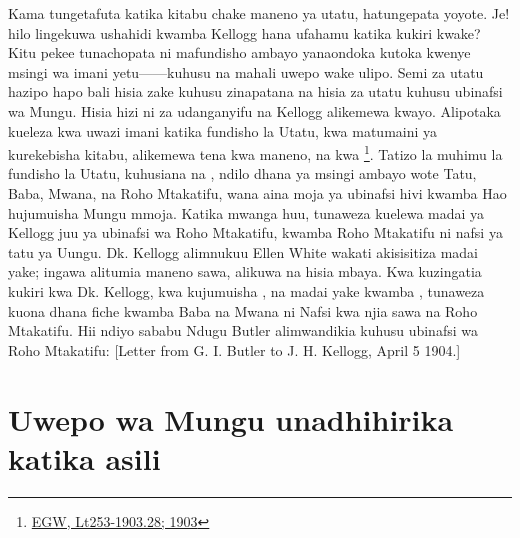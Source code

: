 Kama tungetafuta katika kitabu chake maneno ya utatu, hatungepata yoyote. Je! hilo lingekuwa ushahidi kwamba Kellogg hana ufahamu katika kukiri kwake? Kitu pekee tunachopata ni mafundisho ambayo yanaondoka kutoka kwenye msingi wa imani yetu——kuhusu  na mahali uwepo wake ulipo. Semi za utatu hazipo hapo bali hisia zake kuhusu  zinapatana na hisia za utatu kuhusu ubinafsi wa Mungu. Hisia hizi ni za udanganyifu na Kellogg alikemewa kwayo. Alipotaka kueleza kwa uwazi imani katika fundisho la Utatu, kwa matumaini ya kurekebisha kitabu, alikemewa tena kwa maneno,  na kwa \footnote{\href{https://egwwritings.org/?ref=en_Lt253-1903.28&para=9980.36}{EGW, Lt253-1903.28; 1903}}. Tatizo la muhimu la fundisho la Utatu, kuhusiana na , ndilo dhana ya msingi ambayo wote Tatu, Baba, Mwana, na Roho Mtakatifu, wana aina moja ya ubinafsi hivi kwamba Hao hujumuisha Mungu mmoja. Katika mwanga huu, tunaweza kuelewa madai ya Kellogg juu ya ubinafsi wa Roho Mtakatifu, kwamba Roho Mtakatifu ni nafsi ya tatu ya Uungu. Dk. Kellogg alimnukuu Ellen White wakati akisisitiza madai yake; ingawa alitumia maneno sawa, alikuwa na hisia mbaya. Kwa kuzingatia kukiri kwa Dk. Kellogg, kwa kujumuisha , na madai yake kwamba , tunaweza kuona dhana fiche kwamba Baba na Mwana ni Nafsi kwa njia sawa na Roho Mtakatifu. Hii ndiyo sababu Ndugu Butler alimwandikia kuhusu ubinafsi wa Roho Mtakatifu: [Letter from G. I. Butler to J. H. Kellogg, April 5 1904.]


\section*{Uwepo wa Mungu unadhihirika katika asili}


